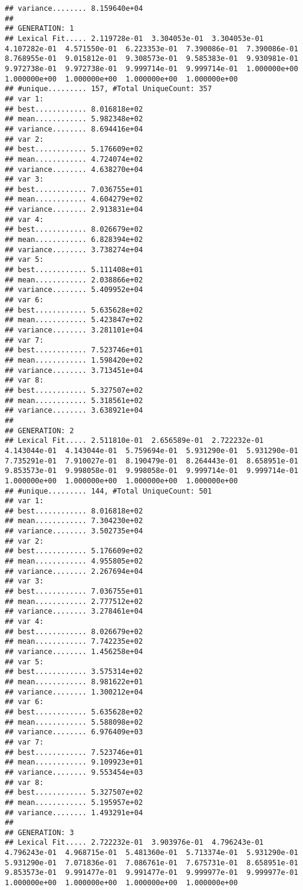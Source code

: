 \documentclass[]{article}
\begin{document}
\begin{verbatim}
## variance........ 8.159640e+04
## 
## GENERATION: 1
## Lexical Fit..... 2.119728e-01  3.304053e-01  3.304053e-01  4.107282e-01  4.571550e-01  6.223353e-01  7.390086e-01  7.390086e-01  8.768955e-01  9.015812e-01  9.308573e-01  9.585383e-01  9.930981e-01  9.972738e-01  9.972738e-01  9.999714e-01  9.999714e-01  1.000000e+00  1.000000e+00  1.000000e+00  1.000000e+00  1.000000e+00  
## #unique......... 157, #Total UniqueCount: 357
## var 1:
## best............ 8.016818e+02
## mean............ 5.982348e+02
## variance........ 8.694416e+04
## var 2:
## best............ 5.176609e+02
## mean............ 4.724074e+02
## variance........ 4.638270e+04
## var 3:
## best............ 7.036755e+01
## mean............ 4.604279e+02
## variance........ 2.913831e+04
## var 4:
## best............ 8.026679e+02
## mean............ 6.828394e+02
## variance........ 3.738274e+04
## var 5:
## best............ 5.111408e+01
## mean............ 2.038866e+02
## variance........ 5.409952e+04
## var 6:
## best............ 5.635628e+02
## mean............ 5.423847e+02
## variance........ 3.281101e+04
## var 7:
## best............ 7.523746e+01
## mean............ 1.598420e+02
## variance........ 3.713451e+04
## var 8:
## best............ 5.327507e+02
## mean............ 5.318561e+02
## variance........ 3.638921e+04
## 
## GENERATION: 2
## Lexical Fit..... 2.511810e-01  2.656589e-01  2.722232e-01  4.143044e-01  4.143044e-01  5.759694e-01  5.931290e-01  5.931290e-01  7.735291e-01  7.910027e-01  8.190479e-01  8.264443e-01  8.658951e-01  9.853573e-01  9.998058e-01  9.998058e-01  9.999714e-01  9.999714e-01  1.000000e+00  1.000000e+00  1.000000e+00  1.000000e+00  
## #unique......... 144, #Total UniqueCount: 501
## var 1:
## best............ 8.016818e+02
## mean............ 7.304230e+02
## variance........ 3.502735e+04
## var 2:
## best............ 5.176609e+02
## mean............ 4.955805e+02
## variance........ 2.267694e+04
## var 3:
## best............ 7.036755e+01
## mean............ 2.777512e+02
## variance........ 3.278461e+04
## var 4:
## best............ 8.026679e+02
## mean............ 7.742235e+02
## variance........ 1.456258e+04
## var 5:
## best............ 3.575314e+02
## mean............ 8.981622e+01
## variance........ 1.300212e+04
## var 6:
## best............ 5.635628e+02
## mean............ 5.588098e+02
## variance........ 6.976409e+03
## var 7:
## best............ 7.523746e+01
## mean............ 9.109923e+01
## variance........ 9.553454e+03
## var 8:
## best............ 5.327507e+02
## mean............ 5.195957e+02
## variance........ 1.493291e+04
## 
## GENERATION: 3
## Lexical Fit..... 2.722232e-01  3.903976e-01  4.796243e-01  4.796243e-01  4.968715e-01  5.481360e-01  5.713374e-01  5.931290e-01  5.931290e-01  7.071836e-01  7.086761e-01  7.675731e-01  8.658951e-01  9.853573e-01  9.991477e-01  9.991477e-01  9.999977e-01  9.999977e-01  1.000000e+00  1.000000e+00  1.000000e+00  1.000000e+00  

\end{verbatim}
\end{document}
